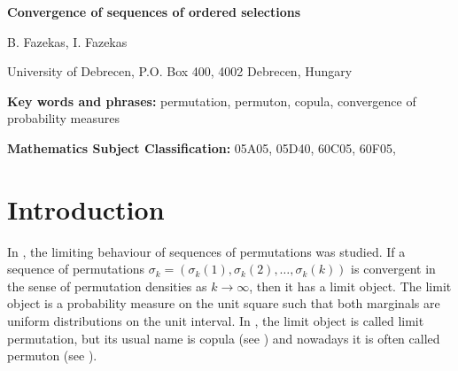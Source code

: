 \documentclass[12pt,twoside]{article}
\theoremstyle{definition}
\theoremstyle{remark}
\numberwithin{equation}{section}
\theoremstyle{plain}
\theoremstyle{remark}
\begin{document}
\setcounter{page}{1}

\pagestyle{myheadings}

\centerline{\large{\bf {Convergence of sequences of ordered selections}}}

\bigskip

\centerline{ {B. Fazekas, I. Fazekas}}

\bigskip
University of Debrecen,  P.O. Box 400, 4002 Debrecen, Hungary

\medskip \bigskip

\begin{abstract}
In this paper, we introduce a convergence notion for ordered selections.
Our convergence notion is based on subpermutation densities and convergences of the marginal distributions.
A particular case of this convergence is the well-known convergence of permutation sequences.
We also introduce a family of probability measures called generalized permutons.
We show that in the family of generalized permutons several convergence notions are equivalent.
We embed the set of ordered selections to the set of generalized permutons.
We prove that any convergent sequence of ordered selections has a limit which is a generalized permuton.
Moreover, any generalized permuton is the limit of a sequence of ordered selections.
Our results are generalizations of well-known theorems on convergence of permutation sequences to permutons.
\end{abstract}

\renewcommand{\thefootnote}{}
{}

{\bf Key words and phrases:} permutation, permuton, copula, convergence of probability measures

{\bf Mathematics Subject Classification:} 
05A05, %
05D40,%
60C05,%
60F05,%



\section{Introduction} \label{introduction}
\setcounter{equation}{0}
In \cite{Hoppen}, the limiting behaviour of sequences of permutations was studied.
If a sequence of permutations $\sigma_{k} =(\sigma_k(1), \sigma_k(2), \dots , \sigma_k(k))$
is convergent in the sense of permutation densities as $k\to \infty$, 
then it has a limit object.
The limit object is a probability measure on the unit square such that both marginals are uniform 
distributions on the unit interval.
In \cite{Hoppen}, the limit object is called limit permutation, but its usual name is copula
(see \cite{Grubel}) and nowadays it is often called permuton (see \cite{Glebov}).
\end{document}
